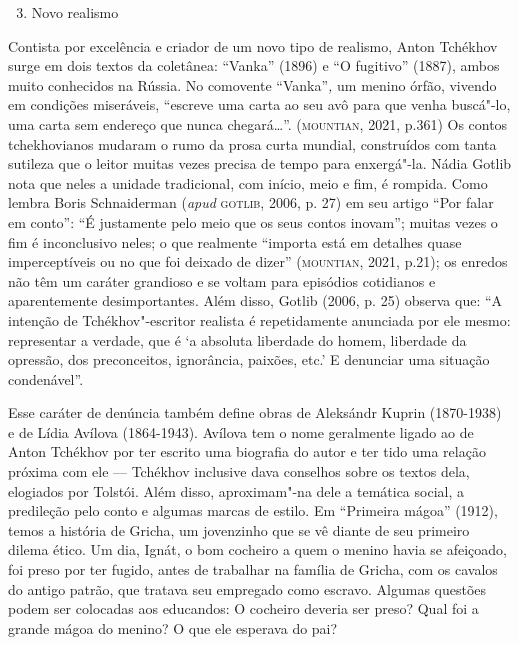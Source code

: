 \documentclass[11pt]{extarticle}
\begin{document}

\begin{enumerate}
\setcounter{enumi}{2}
\item Novo realismo
\end{enumerate}

Contista por excelência e criador de um novo tipo de realismo, Anton
Tchékhov surge em dois textos da coletânea: ``Vanka'' (1896) e ``O
fugitivo'' (1887), ambos muito conhecidos na Rússia. No comovente
``Vanka''\emph{,} um menino órfão, vivendo em condições miseráveis,
``escreve uma carta ao seu avô para que venha buscá"-lo, uma carta sem
endereço que nunca chegará\ldots{}''. (\textsc{mountian}, 2021, p.361) Os contos
tchekhovianos mudaram o rumo da prosa curta mundial, construídos com
tanta sutileza que o leitor muitas vezes precisa de tempo para
enxergá"-la. Nádia Gotlib nota que neles a unidade tradicional, com
início, meio e fim, é rompida. Como lembra Boris Schnaiderman
(\emph{apud} \textsc{gotlib}, 2006, p. 27) em seu artigo ``Por falar em conto'':
``É justamente pelo meio que os seus contos inovam''; muitas vezes o fim
é inconclusivo neles; o que realmente ``importa está em detalhes quase
imperceptíveis ou no que foi deixado de dizer'' (\textsc{mountian}, 2021, p.21);
os enredos não têm um caráter grandioso e se voltam para episódios
cotidianos e aparentemente desimportantes. Além disso, Gotlib (2006, p.
25) observa que: ``A intenção de Tchékhov"-escritor realista é
repetidamente anunciada por ele mesmo: representar a verdade, que é `a
absoluta liberdade do homem, liberdade da opressão, dos preconceitos,
ignorância, paixões, etc.' E denunciar uma situação condenável''.


Esse caráter de denúncia também define obras de Aleksándr Kuprin
(1870-1938) e de Lídia Avílova (1864-1943). Avílova tem o nome
geralmente ligado ao de Anton Tchékhov por ter escrito uma biografia do
autor e ter tido uma relação próxima com ele --- Tchékhov inclusive dava
conselhos sobre os textos dela, elogiados por Tolstói. Além disso,
aproximam"-na dele a temática social, a predileção pelo conto e algumas
marcas de estilo. Em ``Primeira mágoa'' (1912), temos a história
de Gricha, um jovenzinho que se vê diante de seu primeiro dilema ético.
Um dia, Ignát, o bom cocheiro a quem o menino havia se afeiçoado, foi
preso por ter fugido, antes de trabalhar na família de Gricha, com os
cavalos do antigo patrão, que tratava seu empregado como escravo.
Algumas questões podem ser colocadas aos educandos: O cocheiro deveria
ser preso? Qual foi a grande mágoa do menino? O que ele esperava do pai?
\end{document}
